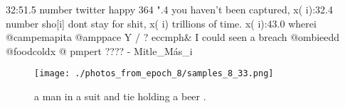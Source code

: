 \documentclass{article}%
\begin{document}
32:51.5\newline%
number\newline%
twitter happy 364 ".4\newline%
you haven't been captured,\newline%
x( i):32.4\newline%
number\newline%
sho{[}i{]} dont stay for shit,\newline%
x( i)\newline%
trillions of time.\newline%
x( i):43.0\newline%
wherei\newline%
@campemapita\newline%
@amppace\newline%
Y /\newline%
? eccmph\& I\newline%
could seen a\newline%
breach\newline%
@ombieedd\newline%
@foodcoldx\newline%
@ pmpert\newline%
????\newline%
{-} Mitle\_Más\_i\newline%

%


\begin{figure}[h!]%
\centering%
\texttt{[image: ./photos\_from\_epoch\_8/samples\_8\_33.png]}%
\caption{a man in a suit and tie holding a beer .}%
\end{figure}

%
\end{document}
